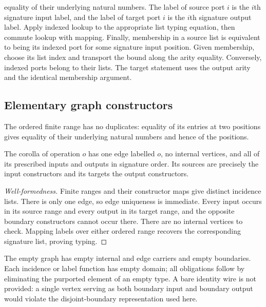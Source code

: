 equality of their underlying natural numbers.
The label of source port $i$ is the $i$th signature input label, and the label of
target port $i$ is the $i$th signature output label. Apply indexed lookup to the
appropriate list typing equation, then commute lookup with mapping.
Finally, membership in a source list is equivalent to being its indexed port for
some signature input position. Given membership, choose its list index and
transport the bound along the arity equality. Conversely, indexed ports belong
to their lists. The target statement uses the output arity and the identical
membership argument.

\subsection{Elementary graph constructors}
The ordered finite range has no duplicates: equality of its entries at two
positions gives equality of their underlying natural numbers and hence of the
positions.
\begin{definition}\label{term:corolla}
The corolla of operation $o$ has one edge labelled $o$, no internal vertices,
and all of its prescribed inputs and outputs in signature order. Its sources
are precisely the input constructors and its targets the output constructors.
\end{definition}
\begin{proof}[Well-formedness]
Finite ranges and their constructor maps give distinct incidence lists. There
is only one edge, so edge uniqueness is immediate. Every input occurs in its
source range and every output in its target range, and the opposite boundary
constructors cannot occur there. There are no internal vertices to check.
Mapping labels over either ordered range recovers the corresponding signature
list, proving typing.
\end{proof}
The empty graph has empty internal and edge carriers and empty boundaries. Each
incidence or label function has empty domain; all obligations follow by eliminating
the purported element of an empty type. A bare identity wire is not provided:
a single vertex serving as both boundary input and boundary output would violate
the disjoint-boundary representation used here.

